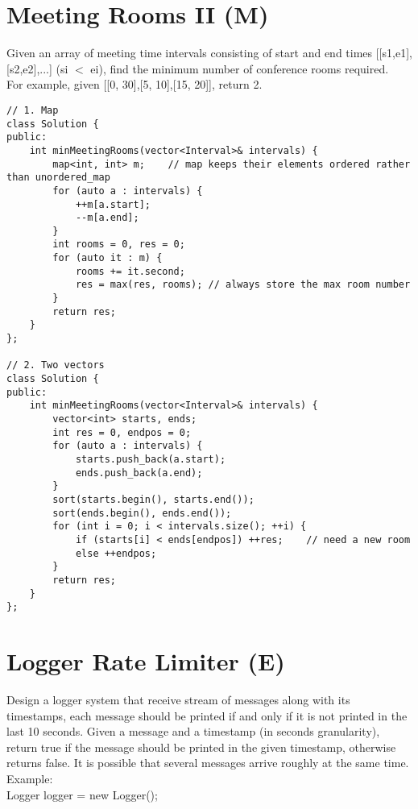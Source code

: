 \section{Meeting Rooms II (M)}
Given an array of meeting time intervals consisting of start and end times [[s1,e1],[s2,e2],...] (si $<$ ei), find the minimum number of conference rooms required.\\

For example, given [[0, 30],[5, 10],[15, 20]], return 2.\\

\begin{lstlisting}
// 1. Map
class Solution {
public:
    int minMeetingRooms(vector<Interval>& intervals) {
        map<int, int> m;    // map keeps their elements ordered rather than unordered_map
        for (auto a : intervals) {
            ++m[a.start];
            --m[a.end];
        }
        int rooms = 0, res = 0;
        for (auto it : m) {
            rooms += it.second;
            res = max(res, rooms); // always store the max room number
        }
        return res;
    }
};

// 2. Two vectors
class Solution {
public:
    int minMeetingRooms(vector<Interval>& intervals) {
        vector<int> starts, ends;
        int res = 0, endpos = 0;
        for (auto a : intervals) {
            starts.push_back(a.start);
            ends.push_back(a.end);
        }
        sort(starts.begin(), starts.end());
        sort(ends.begin(), ends.end());
        for (int i = 0; i < intervals.size(); ++i) {
            if (starts[i] < ends[endpos]) ++res;    // need a new room
            else ++endpos;
        }
        return res;
    }
};
\end{lstlisting}


\section{Logger Rate Limiter (E)}
Design a logger system that receive stream of messages along with its timestamps, each message should be printed if and only if it is not printed in the last 10 seconds. Given a message and a timestamp (in seconds granularity), return true if the message should be printed in the given timestamp, otherwise returns false. It is possible that several messages arrive roughly at the same time.\\

Example:\\
Logger logger = new Logger();\\

